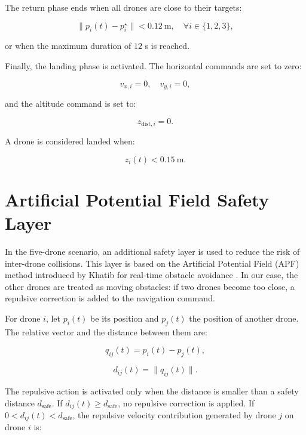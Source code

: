 The return phase ends when all drones are close to their targets:

\begin{equation}
    \|p_i(t)-p_i^{\star}\|<0.12 \ \text{m}, \quad \forall i\in\{1,2,3\},
\end{equation}

or when the maximum duration of $12$ s is reached.

Finally, the landing phase is activated. The horizontal commands are set to zero:

\begin{equation}
    v_{x,i}=0, \quad v_{y,i}=0,
\end{equation}

and the altitude command is set to:

\begin{equation}
    z_{\text{dist},i}=0.
\end{equation}

A drone is considered landed when:

\begin{equation}
    z_i(t)<0.15 \ \text{m}.
\end{equation}


\section{Artificial Potential Field Safety Layer}

In the five-drone scenario, an additional safety layer is used to reduce the risk of inter-drone collisions. This layer is based on the Artificial Potential Field (APF) method introduced by Khatib for real-time obstacle avoidance \cite{khatib1986apf}. In our case, the other drones are treated as moving obstacles: if two drones become too close, a repulsive correction is added to the navigation command.

For drone $i$, let $p_i(t)$ be its position and $p_j(t)$ the position of another drone. The relative vector and the distance between them are:

\begin{equation}
    q_{ij}(t)=p_i(t)-p_j(t),
\end{equation}

\begin{equation}
    d_{ij}(t)=\|q_{ij}(t)\|.
\end{equation}

The repulsive action is activated only when the distance is smaller than a safety distance $d_{\text{safe}}$. If $d_{ij}(t)\geq d_{\text{safe}}$, no repulsive correction is applied. If $0<d_{ij}(t)<d_{\text{safe}}$, the repulsive velocity contribution generated by drone $j$ on drone $i$ is:

